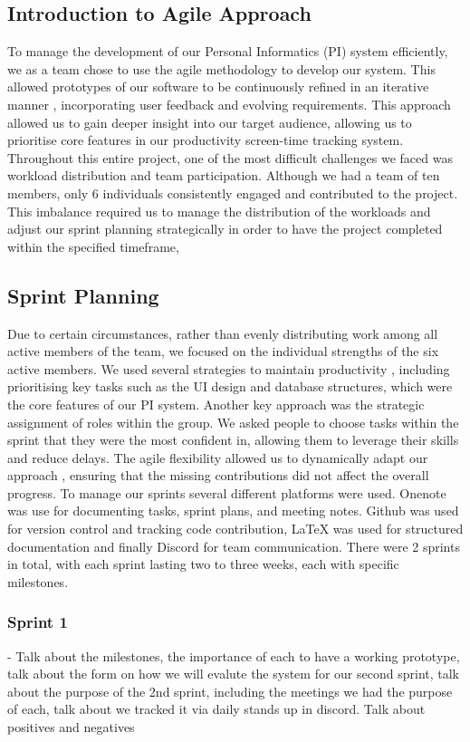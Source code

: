 \documentclass[12pt,a4paper]{article}
\begin{document}
\subsection{Introduction to Agile Approach}
To manage the development of our Personal Informatics (PI) system efficiently, we as a team chose to use the agile methodology to develop our system. This allowed prototypes of our software to be continuously refined in an iterative manner , incorporating user feedback and evolving requirements. This approach allowed us to gain deeper insight into our target audience, allowing us to prioritise core features in our productivity screen-time tracking system. Throughout this entire project, one of the most difficult challenges we faced was workload distribution and team participation. Although we had a team of ten members, only 6 individuals consistently engaged and contributed to the project. This imbalance required us to manage the distribution of the workloads and adjust our sprint planning strategically in order to have the project completed within the specified timeframe,

\subsection{Sprint Planning}
Due to certain circumstances, rather than evenly distributing work among all active members of the team, we focused on the individual strengths of the six active members. We used several strategies to maintain productivity , including prioritising key tasks such as the UI design and database structures, which were the core features of our PI system. Another key approach was the strategic assignment of roles within the group. We asked people to choose tasks within the sprint that they were the most confident in, allowing them to leverage their skills and reduce delays. The agile flexibility allowed us to dynamically adapt our approach , ensuring that the missing contributions did not affect the overall progress.
To manage our sprints several different platforms were used. Onenote was use for documenting tasks, sprint plans, and meeting notes. Github was used for version control and tracking code contribution, LaTeX was used for structured documentation and finally Discord for team communication. There were 2 sprints in total, with each sprint lasting two to three weeks, each with specific milestones.

\subsubsection{Sprint 1}
- Talk about the milestones, the importance of each to have a working prototype, talk about the form on how we will evalute the system for our second sprint, talk about the purpose of the 2nd sprint, including the meetings we had the purpose of each, talk about we tracked it via daily stands up in discord. Talk about positives and negatives
\end{document}
